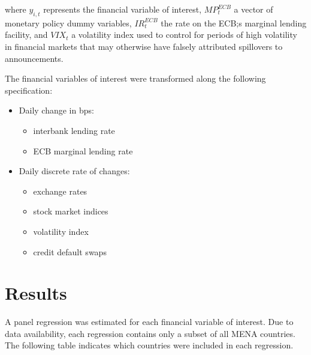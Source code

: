\documentclass[a4paper]{article}
\begin{document}
where $y_{i,t}$ represents the financial variable of interest, $MP^{ECB}_t$ a vector of monetary policy dummy variables, $IR^{ECB}_t$ the rate on the ECB;s marginal lending facility, and $VIX_t$ a volatility index used to control for periods of high volatility in financial markets that may otherwise have falsely attributed spillovers to announcements. 

The financial variables of interest were transformed along the following specification:

\begin{itemize}
	\item Daily change in bps: 
		\begin{itemize}
			\item interbank lending rate
			\item ECB marginal lending rate
		\end{itemize}
	\item Daily discrete rate of changes: 
		\begin{itemize}
			\item exchange rates
			\item stock market indices
			\item volatility index
			\item credit default swaps
		\end {itemize}
\end{itemize}



\section{Results}

A panel regression was estimated for each financial variable of interest. Due to data availability, each regression contains only a subset of all MENA countries. The following table indicates which countries were included in each regression.

















\end{document}
